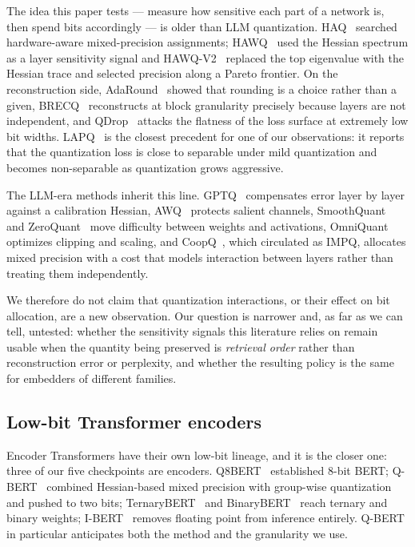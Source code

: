 \documentclass[11pt]{article}
\begin{document}
The idea this paper tests --- measure how sensitive each part of a network is, then spend
bits accordingly --- is older than LLM quantization. HAQ~\cite{haq} searched hardware-aware
mixed-precision assignments; HAWQ~\cite{hawq} used the Hessian spectrum as a layer
sensitivity signal and HAWQ-V2~\cite{hawqv2} replaced the top eigenvalue with the Hessian
trace and selected precision along a Pareto frontier. On the reconstruction side,
AdaRound~\cite{adaround} showed that rounding is a choice rather than a given,
BRECQ~\cite{brecq} reconstructs at block granularity precisely because layers are not
independent, and QDrop~\cite{qdrop} attacks the flatness of the loss surface at extremely low
bit widths. LAPQ~\cite{lapq} is the closest precedent for one of our observations: it reports
that the quantization loss is close to separable under mild quantization and becomes
non-separable as quantization grows aggressive.

The LLM-era methods inherit this line. GPTQ~\cite{gptq} compensates error layer by layer
against a calibration Hessian, AWQ~\cite{awq} protects salient channels,
SmoothQuant~\cite{smoothquant} and ZeroQuant~\cite{zeroquant} move difficulty between weights
and activations, OmniQuant~\cite{omniquant} optimizes clipping and scaling, and
CoopQ~\cite{impq}, which circulated as IMPQ, allocates mixed precision with a cost that
models interaction between layers rather than treating them independently.

We therefore do not claim that quantization interactions, or their effect on bit allocation,
are a new observation. Our question is narrower and, as far as we can tell, untested: whether
the sensitivity signals this literature relies on remain usable when the quantity being
preserved is \emph{retrieval order} rather than reconstruction error or perplexity, and
whether the resulting policy is the same for embedders of different families.

\subsection{Low-bit Transformer encoders}

Encoder Transformers have their own low-bit lineage, and it is the closer one: three of our
five checkpoints are encoders. Q8BERT~\cite{q8bert} established 8-bit BERT;
Q-BERT~\cite{qbert} combined Hessian-based mixed precision with group-wise quantization and
pushed to two bits; TernaryBERT~\cite{ternarybert} and BinaryBERT~\cite{binarybert} reach
ternary and binary weights; I-BERT~\cite{ibert} removes floating point from inference
entirely. Q-BERT in particular anticipates both the method and the granularity we use.
\end{document}
